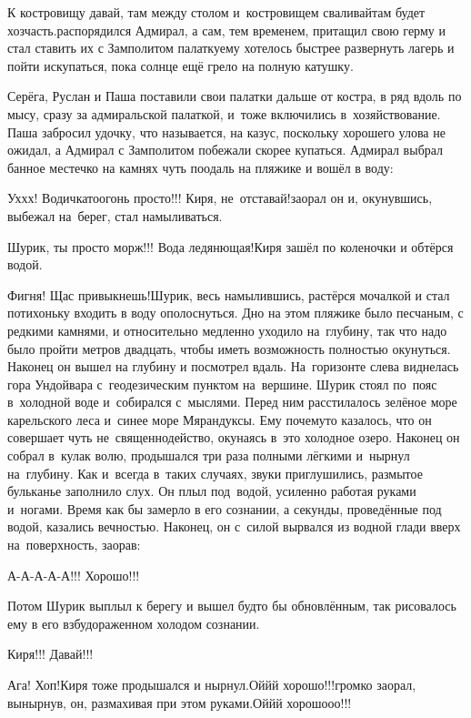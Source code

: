 \diagdash К костровищу давай, там между столом и~костровищем сваливай\mdash там будет хозчасть.\mdash распорядился Адмирал, а сам, тем временем, притащил свою герму и стал ставить их с Замполитом палатку\mdash ему хотелось быстрее развернуть лагерь и пойти искупаться, пока солнце ещё грело на полную катушку.

Серёга, Руслан и Паша поставили свои палатки дальше от костра, в ряд вдоль по мысу, сразу за адмиральской палаткой, и~тоже включились в~хозяйствование. Паша забросил удочку, что называется, на казус, поскольку хорошего улова не ожидал, а Адмирал с Замполитом побежали скорее купаться. Адмирал выбрал банное местечко на камнях чуть поодаль на пляжике и вошёл в воду: 

\diagdash Ух\sdash х\sdash х! Водичка\sdash то\mdash огонь просто!!! Киря, не~отставай!\mdash заорал он и, окунувшись, выбежал на~берег, стал намыливаться.

\diagdash Шурик, ты просто морж!!! Вода ледянющая!\mdash Киря зашёл по коленочки и обтёрся водой.

\diagdash Фигня! Щас привыкнешь!\mdash Шурик, весь намылившись, растёрся мочалкой и стал потихоньку входить в воду ополоснуться. Дно на этом пляжике было песчаным, с редкими камнями, и относительно медленно уходило на~глубину, так что надо было пройти метров двадцать, чтобы иметь возможность полностью окунуться. Наконец он вышел на глубину и посмотрел вдаль. На~горизонте слева виднелась гора Ундойвара с~геодезическим пунктом на~вершине.  Шурик стоял по~пояс в~холодной воде и~собирался с~мыслями. Перед ним расстилалось зелёное море карельского леса и~синее море Мярандуксы. Ему почему\sdash то казалось, что он совершает чуть не~священнодейство, окунаясь в~это холодное озеро. Наконец он собрал в~кулак волю, продышался три раза полными лёгкими и~нырнул на~глубину. Как и~всегда в~таких случаях, звуки приглушились, размытое бульканье заполнило слух. Он плыл под~водой, усиленно работая руками и~ногами. Время как бы замерло в его сознании, а секунды, проведённые под водой, казались вечностью. Наконец, он с~силой вырвался из водной глади вверх на~поверхность, заорав:

\diagdash А-А-А-А-А!!! Хорошо!!!
\nopagebreak

Потом Шурик выплыл к берегу и вышел будто бы обновлённым, так рисовалось ему в его взбудораженном холодом сознании.

\diagdash Киря!!! Давай!!! 

\diagdash Ага! Хоп!\mdash Киря тоже продышался и нырнул.\mdash Ой\sdash й\sdash й хорошо!!!\mdash громко заорал, вынырнув, он, размахивая при этом руками.\mdash Ой\sdash й\sdash й хорошо\sdash о\sdash о!!!

